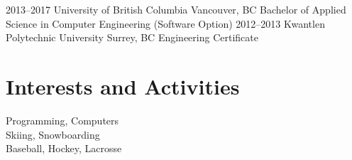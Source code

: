 \documentclass[]{friggeri-cv} %
\begin{document}
\begin{entrylist}
\entry
{2013--2017}
{University of British Columbia}
{Vancouver, BC}
{Bachelor of Applied Science in Computer Engineering (Software Option)}
\entry
{2012--2013}
{Kwantlen Polytechnic University} %
{Surrey, BC}
{Engineering Certificate}
\end{entrylist}






\section{Interests and Activities}

Programming, Computers \\
Skiing, Snowboarding \\
Baseball, Hockey, Lacrosse \\
\end{document}
